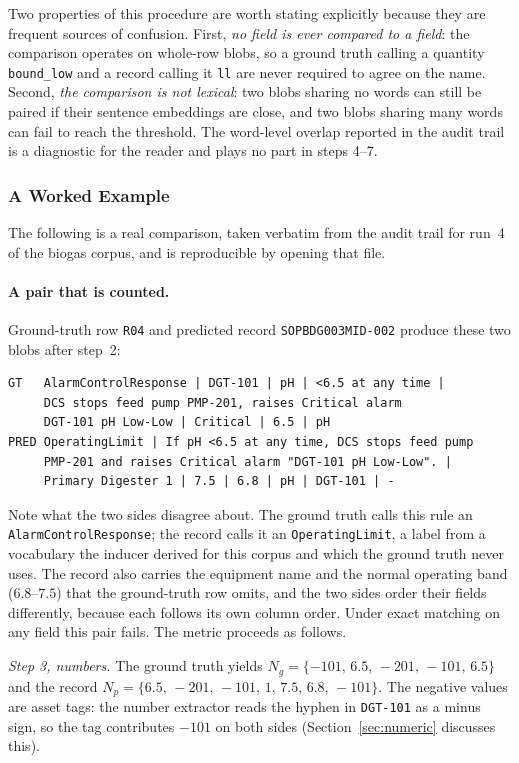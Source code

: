 \documentclass[11pt]{article}
\begin{document}
Two properties of this procedure are worth stating explicitly because they are
frequent sources of confusion. First, \emph{no field is ever compared to a
field}: the comparison operates on whole-row blobs, so a ground truth calling a
quantity \texttt{bound\_low} and a record calling it \texttt{ll} are never
required to agree on the name. Second, \emph{the comparison is not lexical}: two
blobs sharing no words can still be paired if their sentence embeddings are
close, and two blobs sharing many words can fail to reach the threshold. The
word-level overlap reported in the audit trail is a diagnostic for the reader and
plays no part in steps 4--7.

\subsubsection{A Worked Example}
\label{sec:worked_example}
The following is a real comparison, taken verbatim from the audit trail for
run~4 of the biogas corpus, and is reproducible by opening that file.

\paragraph{A pair that is counted.} Ground-truth row \texttt{R04} and predicted
record \texttt{SOPBDG003MID-002} produce these two blobs after step~2:

\begin{lstlisting}
GT   AlarmControlResponse | DGT-101 | pH | <6.5 at any time |
     DCS stops feed pump PMP-201, raises Critical alarm
     DGT-101 pH Low-Low | Critical | 6.5 | pH
PRED OperatingLimit | If pH <6.5 at any time, DCS stops feed pump
     PMP-201 and raises Critical alarm "DGT-101 pH Low-Low". |
     Primary Digester 1 | 7.5 | 6.8 | pH | DGT-101 | -
\end{lstlisting}

Note what the two sides disagree about. The ground truth calls this rule an
\texttt{AlarmControlResponse}; the record calls it an \texttt{OperatingLimit}, a
label from a vocabulary the inducer derived for this corpus and which the ground
truth never uses. The record also carries the equipment name and the normal
operating band ($6.8$--$7.5$) that the ground-truth row omits, and the two sides
order their fields differently, because each follows its own column order. Under
exact matching on any field this pair fails. The metric proceeds as follows.

\emph{Step 3, numbers.} The ground truth yields
$N_g = \{-101,\, 6.5,\, -201,\, -101,\, 6.5\}$ and the record
$N_p = \{6.5,\, -201,\, -101,\, 1,\, 7.5,\, 6.8,\, -101\}$. The negative values
are asset tags: the number extractor reads the hyphen in \texttt{DGT-101} as a
minus sign, so the tag contributes $-101$ on both sides
(Section~\ref{sec:numeric} discusses this).
\end{document}
